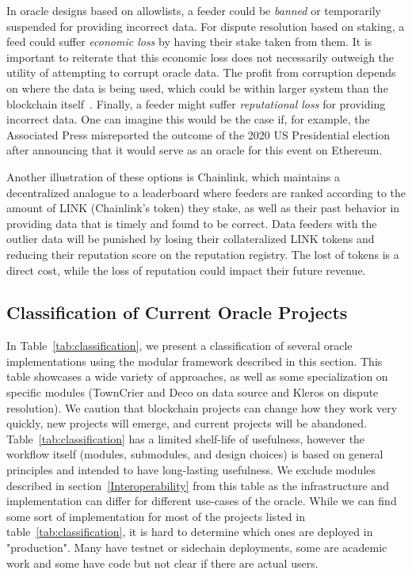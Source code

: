 In oracle designs based on allowlists, a feeder could be \textit{banned} or temporarily suspended for providing incorrect data. For dispute resolution based on staking, a feed could suffer \textit{economic loss} by having their stake taken from them. It is important to reiterate that this economic loss does not necessarily outweigh the utility of attempting to corrupt oracle data. The profit from corruption depends on where the data is being used, which could be within larger system than the blockchain itself~\cite{FoBo19}. Finally, a feeder might suffer \textit{reputational loss} for providing incorrect data. One can imagine this would be the case if, for example, the Associated Press misreported the outcome of the 2020 US Presidential election after announcing that it would serve as an oracle for this event on Ethereum.

Another illustration of these options is Chainlink, which maintains a decentralized analogue to a leaderboard where feeders are ranked according to the amount of LINK (Chainlink's token) they stake, as well as their past behavior in providing data that is timely and found to be correct. Data feeders with the outlier data will be punished by losing their collateralized LINK tokens and reducing their reputation score on the reputation registry. The lost of tokens is a direct cost, while the loss of reputation could impact their future revenue. 




\subsection{Classification of Current Oracle Projects} \label{oracle_categories}



In Table~\ref{tab:classification}, we present a classification of several oracle implementations using the modular framework described in this section. This table showcases a wide variety of approaches, as well as some specialization on specific modules (\eg TownCrier and Deco on data source and Kleros on dispute resolution). We caution that blockchain projects can change how they work very quickly, new projects will emerge, and current projects will be abandoned. Table~\ref{tab:classification} has a limited shelf-life of usefulness, however the workflow itself (modules, submodules, and design choices) is based on general principles and intended to have long-lasting usefulness. We exclude modules described in section~\ref{Interoperability} from this table as the infrastructure and implementation can differ for different use-cases of the oracle.
While we can find some sort of implementation for most of the projects listed in table~\ref{tab:classification}, it is hard to determine which ones are deployed in "production". Many have testnet or sidechain deployments, some are academic work and some have code but not clear if there are actual users.


